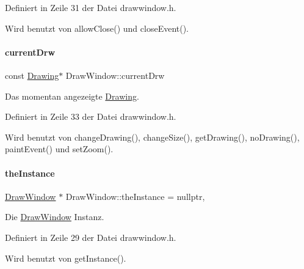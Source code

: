 Definiert in Zeile 31 der Datei drawwindow.\+h.



Wird benutzt von allow\+Close() und close\+Event().

\mbox{\label{classDrawWindow_ac63c11339aa1f1b0259699ca68bead6c}} 
\paragraph{\texorpdfstring{current\+Drw}{currentDrw}}
{\footnotesize\ttfamily const \mbox{\hyperlink{classDrawing}{Drawing}}$\ast$ Draw\+Window\+::current\+Drw\hspace{0.3cm}{\ttfamily [private]}}



Das momentan angezeigte \mbox{\hyperlink{classDrawing}{Drawing}}. 



Definiert in Zeile 33 der Datei drawwindow.\+h.



Wird benutzt von change\+Drawing(), change\+Size(), get\+Drawing(), no\+Drawing(), paint\+Event() und set\+Zoom().

\mbox{\label{classDrawWindow_a39187946e41c9e9087484cba77e7fd5b}} 
\paragraph{\texorpdfstring{the\+Instance}{theInstance}}
{\footnotesize\ttfamily \mbox{\hyperlink{classDrawWindow}{Draw\+Window}} $\ast$ Draw\+Window\+::the\+Instance = nullptr\hspace{0.3cm}{\ttfamily [static]}, {\ttfamily [private]}}



Die \mbox{\hyperlink{classDrawWindow}{Draw\+Window}} Instanz. 



Definiert in Zeile 29 der Datei drawwindow.\+h.



Wird benutzt von get\+Instance().

\mbox{\label{classDrawWindow_a69fa4fea9a23c970cba023ba863340fe}} 
